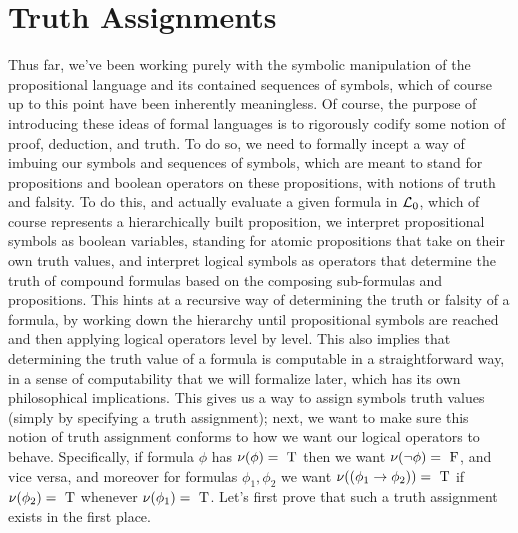 \documentclass{article}
\begin{document}
\section{Truth Assignments}
Thus far, we've been working purely with the symbolic manipulation of the propositional language and its contained sequences of symbols, which of course up to this point have been inherently meaningless. Of course, the purpose of introducing these ideas of formal languages is to rigorously codify some notion of proof, deduction, and truth. To do so, we need to formally incept a way of imbuing our symbols and sequences of symbols, which are meant to stand for propositions and boolean operators on these propositions, with notions of truth and falsity. To do this, and actually evaluate a given formula in $ \mathcal{L}_0 $, which of course represents a hierarchically built proposition, we interpret propositional symbols as boolean variables, standing for atomic propositions that take on their own truth values, and interpret logical symbols as operators that determine the truth of compound formulas based on the composing sub-formulas and propositions. This hints at a recursive way of determining the truth or falsity of a formula, by working down the hierarchy until propositional symbols are reached and then applying logical operators level by level. This also implies that determining the truth value of a formula is computable in a straightforward way, in a sense of computability that we will formalize later, which has its own philosophical implications.
This gives us a way to assign symbols truth values (simply by specifying a truth assignment); next, we want to make sure this notion of truth assignment conforms to how we want our logical operators to behave. Specifically, if formula $ \phi $ has $ \nu(\phi) = \text{\normalfont\ T} $ then we want $ \nu(\neg \phi) = \text{\normalfont\ F} $, and vice versa, and moreover for formulas $ \phi_1, \phi_2 $ we want $ \nu((\phi_1 \rightarrow \phi_2)) = \text{\normalfont\ T} $ if $ \nu(\phi_2) = \text{\normalfont\ T} $ whenever $ \nu(\phi_1) = \text{\normalfont\ T} $. Let's first prove that such a truth assignment exists in the first place.
\end{document}
